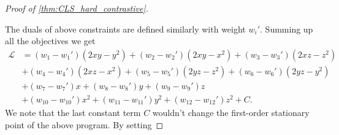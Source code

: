 \documentclass{article}
\theoremstyle{definition}  %
\theoremstyle{plain}
\numberwithin{observation}{section}
\numberwithin{claim}{section}
\numberwithin{fact}{section}
\numberwithin{lemma}{section}
\numberwithin{proposition}{section}
\numberwithin{theorem}{section}
\numberwithin{corollary}{section}
\numberwithin{definition}{section}
\theoremstyle{plain}
\begin{document}
\begin{proof}[Proof of \cref{thm:CLS_hard_contrastive}]
\begin{enumerate}[label = ]
\end{enumerate}

The duals of above constraints are defined similarly with weight $w_i'$. Summing up all the objectives we get
\begin{align*}
    \mathcal{L} & = (w_1 - w_1') \left(2xy - y^2\right) + (w_2 - w_2') \left(2xy - x^2\right) +  (w_3 - w_3') \left(2xz - z^2\right) \\
    & + (w_4 - w_4') \left(2xz - x^2\right) + (w_5 - w_5') \left(2yz - z^2\right) + (w_6 - w_6') \left(2yz - y^2\right)\\ 
    & +  (w_{7} - w_{7}') x + (w_{8} - w_{8}') y + (w_{9} - w_{9}') z  \\
    & +  (w_{10} - w_{10}') x^2 + (w_{11} - w_{11}') y^2 +   (w_{12} - w_{12}') z^2 + C.
\end{align*}
We note that the last constant term $C$ wouldn't change the first-order stationary point of the above program. By setting


\end{proof}
\end{document}
